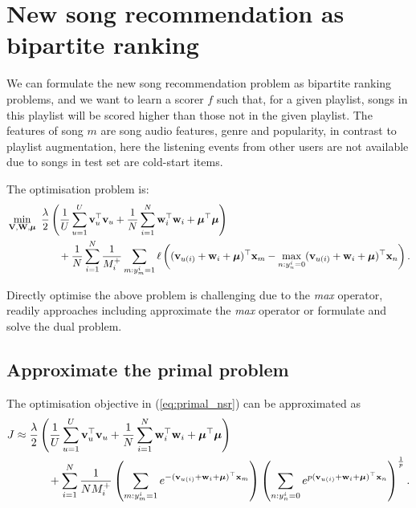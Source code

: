 \section{New song recommendation as bipartite ranking}

We can formulate the new song recommendation problem as bipartite ranking problems, 
and we want to learn a scorer $f$ such that, for a given playlist, 
songs in this playlist will be scored higher than those not in the given playlist.
The features of song $m$ are song audio features, genre and popularity, in contrast to playlist augmentation,
here the listening events from other users are not available due to songs in test set are cold-start items.

The optimisation problem is:
\begin{equation}
\label{eq:primal_nsr}
\begin{aligned}
&\min_{\mathbf{V}, \mathbf{W}, \bm{\mu}} \ \frac{\lambda}{2} \left( \frac{1}{U} \sum_{u=1}^U \mathbf{v}_u^\top \mathbf{v}_u 
     + \frac{1}{N} \sum_{i=1}^N \mathbf{w}_i^\top \mathbf{w}_i + \bm{\mu}^\top \bm{\mu} \right) \\
& \hspace{5em}
     + \frac{1}{N} \sum_{i=1}^N \frac{1}{M_i^+} \sum_{m: y_m^i = 1} \ell \left( (\mathbf{v}_{u(i)} + \mathbf{w}_i + \bm{\mu})^\top \mathbf{x}_m 
     - \max_{n: y_n^i = 0} (\mathbf{v}_{u(i)} + \mathbf{w}_i + \bm{\mu})^\top \mathbf{x}_n \right).
\end{aligned}
\end{equation}

Directly optimise the above problem is challenging due to the \emph{max} operator,
readily approaches including approximate the \emph{max} operator or formulate and solve the dual problem.


\subsection{Approximate the primal problem}
The optimisation objective in (\ref{eq:primal_nsr}) can be approximated as
\begin{equation*}
\begin{aligned}
J 
&\approx \frac{\lambda}{2} \left( \frac{1}{U} \sum_{u=1}^U \mathbf{v}_u^\top \mathbf{v}_u + \frac{1}{N} \sum_{i=1}^N \mathbf{w}_i^\top \mathbf{w}_i + \bm{\mu}^\top \bm{\mu} \right) \\
& \hspace{3em}
  + \sum_{i=1}^N \frac{1}{N M_i^+} 
    \left( \sum_{m: y_m^i = 1} e^{-(\mathbf{v}_{u(i)} + \mathbf{w}_i + \bm{\mu})^\top \mathbf{x}_m} \right)
    \left( \sum_{n: y_n^i = 0} e^{p (\mathbf{v}_{u(i)} + \mathbf{w}_i + \bm{\mu})^\top \mathbf{x}_n} \right)^\frac{1}{p}.
\end{aligned}
\end{equation*}

